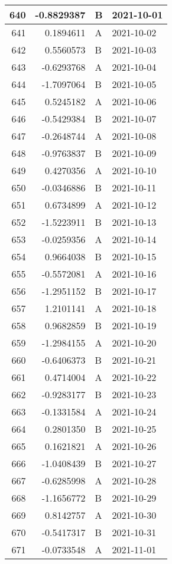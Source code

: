 \begin{tabular}{r|r|l|l}
\hline
640 & -0.8829387 & B & 2021-10-01\\
\hline
641 & 0.1894611 & A & 2021-10-02\\
\hline
642 & 0.5560573 & B & 2021-10-03\\
\hline
643 & -0.6293768 & A & 2021-10-04\\
\hline
644 & -1.7097064 & B & 2021-10-05\\
\hline
645 & 0.5245182 & A & 2021-10-06\\
\hline
646 & -0.5429384 & B & 2021-10-07\\
\hline
647 & -0.2648744 & A & 2021-10-08\\
\hline
648 & -0.9763837 & B & 2021-10-09\\
\hline
649 & 0.4270356 & A & 2021-10-10\\
\hline
650 & -0.0346886 & B & 2021-10-11\\
\hline
651 & 0.6734899 & A & 2021-10-12\\
\hline
652 & -1.5223911 & B & 2021-10-13\\
\hline
653 & -0.0259356 & A & 2021-10-14\\
\hline
654 & 0.9664038 & B & 2021-10-15\\
\hline
655 & -0.5572081 & A & 2021-10-16\\
\hline
656 & -1.2951152 & B & 2021-10-17\\
\hline
657 & 1.2101141 & A & 2021-10-18\\
\hline
658 & 0.9682859 & B & 2021-10-19\\
\hline
659 & -1.2984155 & A & 2021-10-20\\
\hline
660 & -0.6406373 & B & 2021-10-21\\
\hline
661 & 0.4714004 & A & 2021-10-22\\
\hline
662 & -0.9283177 & B & 2021-10-23\\
\hline
663 & -0.1331584 & A & 2021-10-24\\
\hline
664 & 0.2801350 & B & 2021-10-25\\
\hline
665 & 0.1621821 & A & 2021-10-26\\
\hline
666 & -1.0408439 & B & 2021-10-27\\
\hline
667 & -0.6285998 & A & 2021-10-28\\
\hline
668 & -1.1656772 & B & 2021-10-29\\
\hline
669 & 0.8142757 & A & 2021-10-30\\
\hline
670 & -0.5417317 & B & 2021-10-31\\
\hline
671 & -0.0733548 & A & 2021-11-01\\

\end{tabular}
